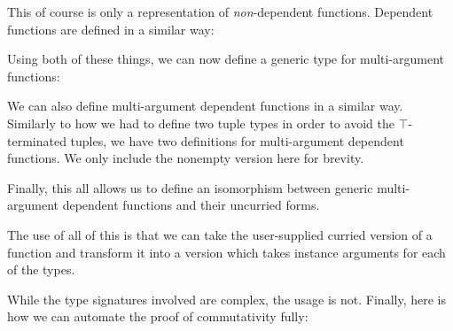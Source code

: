 This of course is only a representation of \emph{non}-dependent functions.
Dependent functions are defined in a similar way:
\begin{agdalisting}
\end{agdalisting}

Using both of these things, we can now define a generic type for multi-argument
functions:
\begin{agdalisting}
\end{agdalisting}
We can also define multi-argument dependent functions in a similar way.
Similarly to how we had to define two tuple types in order to avoid the
\(\top\)-terminated tuples, we have two definitions for multi-argument dependent
functions.
We only include the nonempty version here for brevity.
\begin{agdalisting}
\end{agdalisting}

Finally, this all allows us to define an isomorphism between generic
multi-argument dependent functions and their uncurried forms.
\begin{agdalisting}
\end{agdalisting}

The use of all of this is that we can take the user-supplied curried version of
a function and transform it into a version which takes instance arguments for
each of the types.

\begin{minipage}{\linewidth}
  \begin{multicols}{2}
    \begin{agdalisting}
    \end{agdalisting} \columnbreak
    \begin{agdalisting}
    \end{agdalisting}
  \end{multicols} 
\end{minipage}

While the type signatures involved are complex, the usage is not.
Finally, here is how we can automate the proof of commutativity fully:

\begin{agdalisting}
\end{agdalisting}

